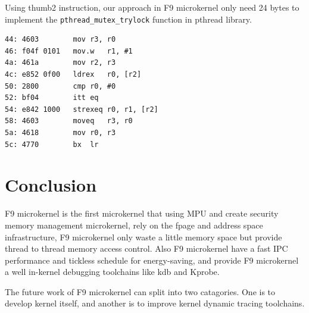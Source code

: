 \documentclass[10pt,preprint,nocopyrightspace]{sigplanconf}
\begin{document}
Using thumb2 instruction, our approach in F9 microkernel only need 24 bytes to implement the \texttt{pthread\_mutex\_trylock} function in pthread library.

\begin{lstlisting}[basicstyle=\small,frame=single]
44:	4603      	mov	r3, r0
46:	f04f 0101 	mov.w	r1, #1
4a:	461a      	mov	r2, r3
4c:	e852 0f00 	ldrex	r0, [r2]
50:	2800      	cmp	r0, #0
52:	bf04      	itt	eq
54:	e842 1000 	strexeq	r0, r1, [r2]
58:	4603      	moveq	r3, r0
5a:	4618      	mov	r0, r3
5c:	4770      	bx	lr
\end{lstlisting}

\section{Conclusion}
F9 microkernel is the first microkernel that using MPU and create security memory management microkernel, rely on the fpage and address space infrastructure, F9 microkernel only waste a little memory space but provide thread to thread memory access control. Also F9 microkernel have a fast IPC performance and tickless schedule for energy-saving, and provide F9 microkernel a well in-kernel debugging toolchains like kdb and Kprobe.

The future work of F9 microkernel can split into two catagories. One is to develop kernel itself, and another is to improve kernel dynamic tracing toolchains.


\end{document}
